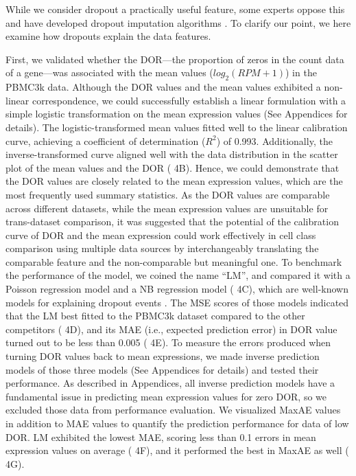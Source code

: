 \documentclass{article}
\begin{document}
While we consider dropout a practically useful feature, some experts oppose this and have developed dropout 
imputation algorithms \cite{kim2020demystifying}. To clarify our point, we here examine how dropouts explain the data features.

First, we validated whether the \ac{DOR}---the proportion of zeros in the count data of a gene---was 
associated with the mean values ($log_2(RPM+1)$) in the PBMC3k data. Although the DOR values and the mean values 
exhibited a non-linear correspondence, we could successfully establish a linear formulation with a simple logistic 
transformation on the mean expression values (See Appendices for details). The logistic-transformed mean values 
fitted well to the linear calibration curve, achieving a coefficient of determination ($R^2$) of 0.993. Additionally, 
the inverse-transformed curve aligned well with the data distribution in the scatter plot of the mean values and the 
DOR (\figurename{ 4B}). Hence, we could demonstrate that the DOR values are closely related to the mean expression values, 
which are the most frequently used summary statistics. As the DOR values are comparable across different 
datasets, while the mean expression values are unsuitable for trans-dataset comparison, it was suggested that the potential 
of the calibration curve of DOR and the mean expression could work effectively in cell class comparison using multiple 
data sources by interchangeably translating the comparable feature and the non-comparable but 
meaningful one. To benchmark the performance of the model, we coined the name ``\ac{LM}'', and 
compared it with a Poisson regression model and a \ac{NB} regression model (\figurename{ 4C}), which 
are well-known models for explaining dropout events \cite{choi2020bayesian}. The \ac{MSE} scores of those models 
indicated that the LM best fitted to the PBMC3k dataset compared to the other competitors (\figurename{ 4D}), and 
its \ac{MAE} (i.e., expected prediction error) in DOR value turned out to be less than 0.005 
(\figurename{ 4E}). To measure the errors produced when turning DOR values back to mean expressions, we made inverse 
prediction models of those three models (See Appendices for details) and tested their performance. As described in 
Appendices, all inverse prediction models have a fundamental issue in predicting mean expression values for zero 
DOR, so we excluded those data from performance evaluation. We visualized \ac{MaxAE} 
values in addition to MAE values to quantify the prediction performance for data of low DOR. LM exhibited the 
lowest MAE, scoring less than 0.1 errors in mean expression values on average (\figurename{ 4F}), and it performed 
the best in MaxAE as well (\figurename{ 4G}).
\end{document}
